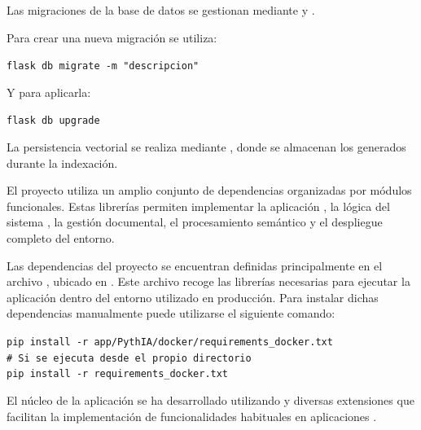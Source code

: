 Las migraciones de la base de datos se gestionan mediante  y .

Para crear una nueva migración se utiliza:

\begin{tcolorbox}[
	colback=black!3,
	colframe=black!30,
	boxrule=0.5pt,
	arc=2mm,
	title= Terminal,
	fonttitle=\bfseries,
	breakable
]
	{\footnotesize
		\noindent
		\texttt{flask db migrate -m "descripcion"}
	}
\end{tcolorbox}

Y para aplicarla:

\begin{tcolorbox}[
	colback=black!3,
	colframe=black!30,
	boxrule=0.5pt,
	arc=2mm,
	title= Terminal,
	fonttitle=\bfseries,
	breakable
]
	{\footnotesize
		\noindent
		\texttt{flask db upgrade}
	}
\end{tcolorbox}

La persistencia vectorial se realiza mediante , donde se almacenan los  generados durante la indexación.

El proyecto utiliza un amplio conjunto de dependencias organizadas por módulos funcionales. Estas librerías permiten implementar la aplicación , la lógica del sistema , la gestión documental, el procesamiento semántico y el despliegue completo del entorno.

Las dependencias del proyecto se encuentran definidas principalmente en el archivo , ubicado en . Este archivo recoge las librerías necesarias para ejecutar la aplicación dentro del entorno  utilizado en producción. Para instalar dichas dependencias manualmente puede utilizarse el siguiente comando:

\begin{tcolorbox}[
	colback=black!3,
	colframe=black!30,
	boxrule=0.5pt,
	arc=2mm,
	title= Terminal,
	fonttitle=\bfseries,
	breakable
]
	{\footnotesize
		\noindent	
	\texttt{pip install -r app/PythIA/docker/requirements\_docker.txt}\\
	\texttt{\#  Si se ejecuta desde el propio directorio}\\
	\texttt{pip install -r requirements\_docker.txt}
	}
\end{tcolorbox}

El núcleo de la aplicación se ha desarrollado utilizando  y diversas extensiones que facilitan la implementación de funcionalidades habituales en aplicaciones .

